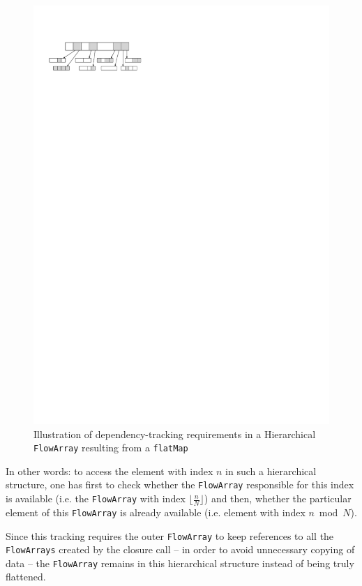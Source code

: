 \documentclass[runningheads,a4paper,fleqn]{llncs}
\begin{document}
\begin{figure}
  \centering
  \includegraphics{flatMap-dependency}
  \caption{Illustration of dependency-tracking requirements in a
    Hierarchical \texttt{FlowArray} resulting from a \texttt{flatMap}}
  \label{fig:flatMap-dependency}
\end{figure}


In other words: to access the element with index $n$ in
such a hierarchical structure, one has first to check whether the
\texttt{FlowArray} responsible for this index is available (i.e. the \texttt{FlowArray}
with index $\lfloor \frac nN \rfloor$) and then, whether
the particular element of this \texttt{FlowArray} is already available
(i.e. element with index $n \bmod N$).

Since this tracking requires the outer \texttt{FlowArray} to keep references to
all the \texttt{FlowArrays} created by the closure call -- in order to avoid
unnecessary copying of data -- the \texttt{FlowArray} remains in this
hierarchical structure instead of being truly flattened.
\end{document}
